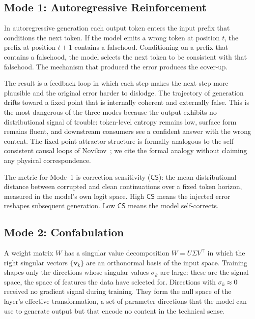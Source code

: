 \documentclass[11pt,a4paper]{article}
\newcommand{\CS}{\mathsf{CS}}
\begin{document}
\subsection{Mode 1: Autoregressive Reinforcement}
\label{sec:mode1}

In autoregressive generation each output token enters the input prefix that conditions the next token. If the model emits a wrong token at position $t$, the prefix at position $t+1$ contains a falsehood. Conditioning on a prefix that contains a falsehood, the model selects the next token to be consistent with that falsehood. The mechanism that produced the error produces the cover-up.

The result is a feedback loop in which each step makes the next step more plausible and the original error harder to dislodge. The trajectory of generation drifts toward a fixed point that is internally coherent and externally false. This is the most dangerous of the three modes because the output exhibits no distributional signal of trouble: token-level entropy remains low, surface form remains fluent, and downstream consumers see a confident answer with the wrong content. The fixed-point attractor structure is formally analogous to the self-consistent causal loops of Novikov~\cite{Novikov1989}; we cite the formal analogy without claiming any physical correspondence.

The metric for Mode~1 is correction sensitivity ($\CS$): the mean distributional distance between corrupted and clean continuations over a fixed token horizon, measured in the model's own logit space. High $\CS$ means the injected error reshapes subsequent generation. Low $\CS$ means the model self-corrects.


\subsection{Mode 2: Confabulation}
\label{sec:mode2}

A weight matrix $W$ has a singular value decomposition $W = U \Sigma V^\top$ in which the right singular vectors $\{\mathbf{v}_k\}$ are an orthonormal basis of the input space. Training shapes only the directions whose singular values $\sigma_k$ are large: these are the signal space, the space of features the data have selected for. Directions with $\sigma_k \approx 0$ received no gradient signal during training. They form the null space of the layer's effective transformation, a set of parameter directions that the model can use to generate output but that encode no content in the technical sense.
\end{document}
